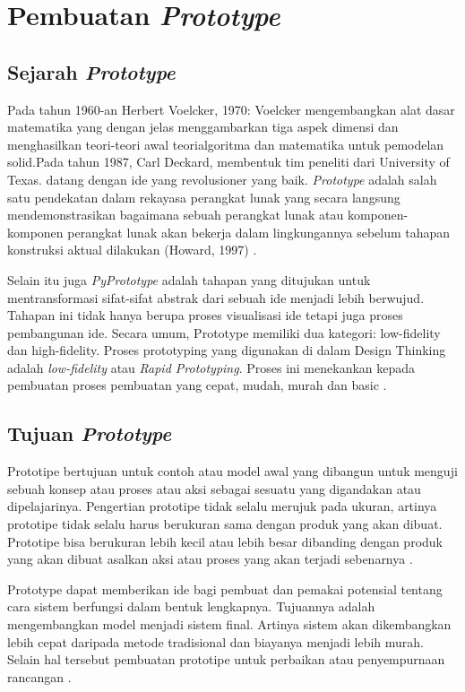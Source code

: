 \chapter{Pembuatan \textit{Prototype}}

\section{Sejarah \textit{Prototype}}
Pada tahun 1960-an Herbert Voelcker, 1970: Voelcker mengembangkan alat dasar matematika yang dengan jelas menggambarkan tiga aspek dimensi dan menghasilkan teori-teori awal teorialgoritma dan matematika untuk pemodelan solid.Pada tahun 1987, Carl Deckard, membentuk tim peneliti dari University of Texas. datang dengan ide yang revolusioner yang baik. \textit{Prototype} adalah salah satu pendekatan dalam rekayasa perangkat lunak yang secara langsung mendemonstrasikan bagaimana sebuah perangkat lunak atau komponen-komponen perangkat lunak akan bekerja dalam lingkungannya sebelum tahapan konstruksi aktual dilakukan (Howard, 1997) .

Selain itu juga \textit{PyPrototype} adalah tahapan yang ditujukan untuk mentransformasi sifat-sifat abstrak dari sebuah ide menjadi lebih berwujud. Tahapan ini tidak hanya berupa proses visualisasi ide tetapi juga proses pembangunan ide. Secara umum, Prototype memiliki dua kategori: low-fidelity dan high-fidelity. Proses prototyping yang digunakan di dalam Design Thinking adalah \textit{low-fidelity} atau \textit{Rapid Prototyping}. Proses ini menekankan kepada pembuatan proses pembuatan yang cepat, mudah, murah dan basic .

\section{Tujuan \textit{Prototype}}
Prototipe bertujuan untuk contoh atau model awal yang dibangun untuk menguji sebuah konsep atau proses atau aksi sebagai sesuatu yang digandakan atau dipelajarinya. Pengertian prototipe tidak selalu merujuk pada ukuran, artinya prototipe tidak selalu harus berukuran sama dengan produk yang akan dibuat. Prototipe bisa berukuran lebih kecil atau lebih besar dibanding dengan produk yang akan dibuat asalkan aksi atau proses yang akan terjadi sebenarnya . 

Prototype dapat memberikan ide bagi pembuat dan pemakai potensial tentang cara sistem berfungsi dalam bentuk lengkapnya. Tujuannya adalah mengembangkan model menjadi sistem final. Artinya sistem akan dikembangkan lebih cepat daripada metode tradisional dan biayanya menjadi lebih murah. Selain hal tersebut pembuatan prototipe untuk perbaikan atau penyempurnaan rancangan .

